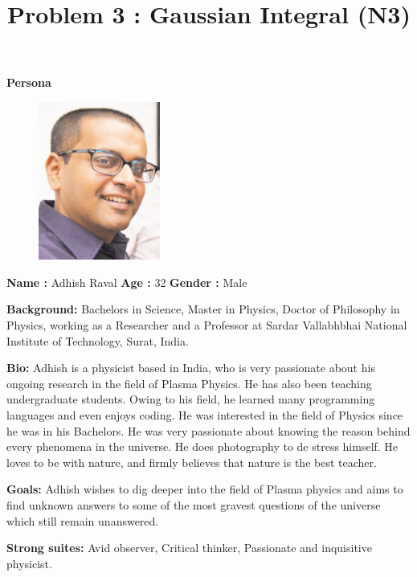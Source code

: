\documentclass{article}
\title{Problem 3 : Gaussian Integral (N3)}
\begin{document}
\maketitle

\centering\textbf{Persona}

\begin{figure}[htp]
    \centering
    \includegraphics[width=4cm]{adhish}
\end{figure}
\textbf{Name : } Adhish Raval \hfill\break
\textbf{Age : } 32 \hfill\break
\textbf{Gender : } Male \hfill\break

\justifying
\noindent
\textbf{Background:} 
Bachelors in Science, Master in Physics, Doctor of Philosophy in Physics, working as a Researcher and a Professor at Sardar Vallabhbhai National Institute of Technology, Surat, India. \hfill\break

\justifying
\noindent
\textbf{Bio:}
Adhish is a physicist based in India, who is very passionate about his ongoing research in the field of Plasma Physics. He has also been teaching undergraduate students. Owing to his field, he learned many programming languages and even enjoys coding. He was interested in the field of Physics since he was in his Bachelors. He was very passionate about knowing the reason behind every phenomena in the universe. He does photography to de stress himself. He loves to be with nature, and firmly believes that nature is the best teacher. \hfill\break 

\justifying
\noindent
\textbf{Goals:} Adhish wishes to dig deeper into the field of Plasma physics and aims to find unknown answers to some of the most gravest questions of the universe which still remain unanswered. \hfill\break

\justifying
\noindent
\textbf{Strong suites:} Avid observer, Critical thinker, Passionate  and inquisitive physicist. \hfill\break
\end{document}
